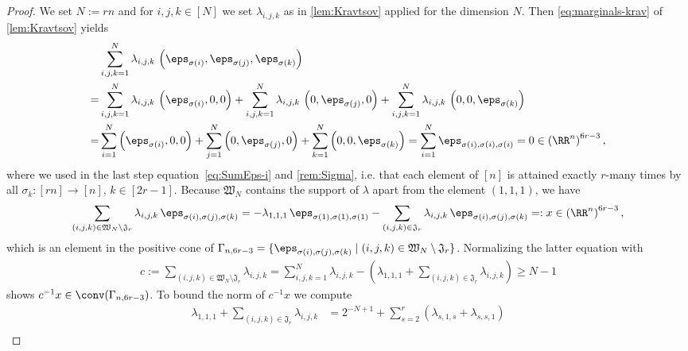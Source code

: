 \begin{proof}
We set $N := r n$ and for $i,j,k \in [N]$ we set $\lambda_{i,j,k}$ as in \cref{lem:Kravtsov} applied for the dimension $N$. Then \cref{eq:marginals-krav} of \cref{lem:Kravtsov} yields
	\begin{align*}
	&\sum_{i,j,k=1}^N \lambda_{i,j,k} \, \left( \eps_{\sigma(i)}, \eps_{\sigma(j)}, \eps_{\sigma(k)} \right)\\
	= &\sum_{i,j,k=1}^N \lambda_{i,j,k} \, \left( \eps_{\sigma(i)}, 0, 0 \right)+ \sum_{i,j,k=1}^N \lambda_{i,j,k} \, \left( 0, \eps_{ \sigma(j)}, 0 \right) + \sum_{i,j,k=1}^N \lambda_{i,j,k} \, \left( 0, 0, \eps_{\sigma(k)} \right) \\
	= &\sum_{i=1}^N \left( \eps_{\sigma(i)}, 0, 0 \right)+ \sum_{j=1}^N  \left( 0, \eps_{ \sigma(j)}, 0 \right) + \sum_{k=1}^N \left( 0, 0, \eps_{\sigma(k)} \right) 
	= \sum_{i=1}^N \eps_{\sigma(i),\sigma(i),\sigma(i)} = 0 \in \left(\RR^n \right)^{6 r - 3},
	\end{align*}
where we used in the last step equation~\eqref{eq:SumEps-i} and \cref{rem:Sigma}, i.e. that each element of $[n]$ is attained exactly $r$-many times by all $\sigma_k \colon [r n] \to [n]$, $k \in [2 r - 1]$. Because $\mathfrak{W}_{N}$ contains the support of $\lambda$ apart from the element $(1,1,1)$, we have
	\begin{align}
	\sum_{(i,j,k) \in \mathfrak{W}_{N} \setminus \mathfrak{J}_{r}} \lambda_{i,j,k} \, \eps_{\sigma(i), \sigma(j), \sigma(k)} =  - \lambda_{1,1,1} \, \eps_{\sigma(1), \sigma(1), \sigma(1)} -  \sum_{(i,j,k) \in \mathfrak{J}_{r}} \lambda_{i,j,k} \, \eps_{\sigma(i), \sigma(j), \sigma(k)} =: x \in \left( \RR^n \right)^{6 r - 3},\label{eq:x-stacked}
	\end{align}
which is an element in the positive cone of $\Gamma_{n,6 r - 3} = \lbrace \eps_{\sigma(i), \sigma(j), \sigma(k)} \mid (i,j,k) \in \mathfrak{W}_N \setminus \mathfrak{J}_{r} \rbrace$.
Normalizing the latter equation with
	\begin{align*}
	c := \sum_{(i,j,k) \in \mathfrak{W}_{N} \setminus \mathfrak{J}_{r}} \lambda_{i,j,k} 
	= \sum_{i,j,k=1}^N \lambda_{i,j,k} - \left( \lambda_{1,1,1} + \sum_{(i,j,k)\in \mathfrak{J}_{r}} \lambda_{i,j,k} \right) \geq N-1
	\end{align*}
shows $c^{-1} x \in \conv(\Gamma_{n,6 r - 3})$. To bound the norm of $c^{-1} x$ we compute
	\begin{align*}
	\lambda_{1,1,1} + \sum_{(i,j,k) \in \mathfrak{J}_{r}} \lambda_{i,j,k} &= 2^{-N+1} + \sum_{s=2}^r \left( \lambda_{s,1,s} + \lambda_{s,s,1} \right) \\

\end{align*}
\end{proof}
